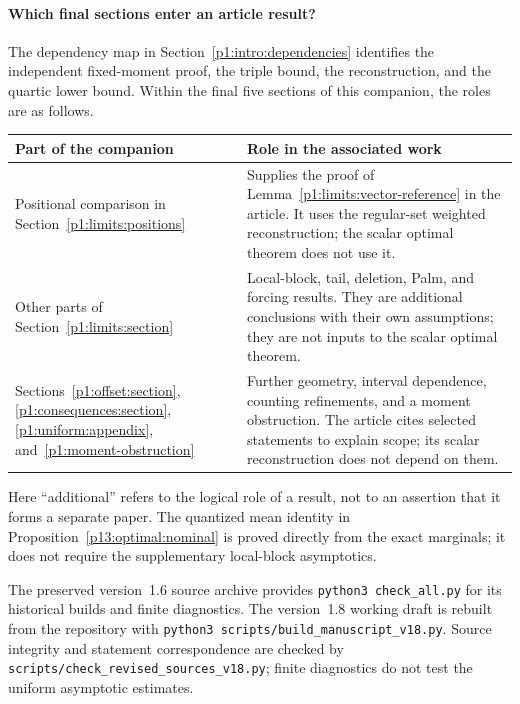 \paragraph{Which final sections enter an article result?}
The dependency map in Section~\ref{p1:intro:dependencies} identifies
the independent fixed-moment proof, the triple bound, the
reconstruction, and the quartic lower bound. Within the final five
sections of this companion, the roles are as follows.

\begin{center}
\small
\begin{tabularx}{\textwidth}{@{}>{\raggedright\arraybackslash}p{}>{\raggedright\arraybackslash}X@{}}
\toprule
Part of the companion & Role in the associated work\\
\midrule
Positional comparison in
Section~\ref{p1:limits:positions}
& Supplies the proof of Lemma~\ref{p1:limits:vector-reference}
in the article. It uses the regular-set weighted reconstruction;
the scalar optimal theorem does not use it.\\[4pt]
Other parts of Section~\ref{p1:limits:section}
& Local-block, tail, deletion, Palm, and forcing results.
They are additional conclusions with their own assumptions;
they are not inputs to the scalar optimal theorem.\\[4pt]
Sections~\ref{p1:offset:section},
\ref{p1:consequences:section}, \ref{p1:uniform:appendix},
and~\ref{p1:moment-obstruction}
& Further geometry, interval dependence, counting refinements,
and a moment obstruction. The article cites selected statements
to explain scope; its scalar reconstruction does not depend on them.\\
\bottomrule
\end{tabularx}
\end{center}

Here ``additional'' refers to the logical role of a result, not
to an assertion that it forms a separate paper. The quantized
mean identity in Proposition~\ref{p13:optimal:nominal} is proved
directly from the exact marginals; it does not require the
supplementary local-block asymptotics.

The preserved version~1.6 source archive provides
\texttt{python3 check\_all.py} for its historical builds and finite
diagnostics. The version~1.8 working draft is rebuilt from the repository with
\texttt{python3 scripts/build\_manuscript\_v18.py}.
Source integrity and statement correspondence are checked by
\texttt{scripts/check\_revised\_sources\_v18.py}; finite diagnostics
do not test the uniform asymptotic estimates.
